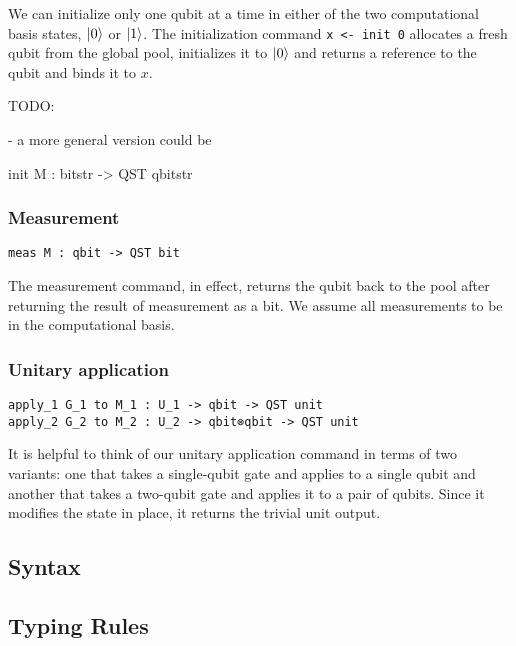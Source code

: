 \documentclass[adraft,creativecommons]{eptcs}
\theoremstyle{definition}
\theoremstyle{remark}
\begin{document}
We can initialize only one qubit at a time in either of the two computational basis states, $\ket{0}$ or $\ket{1}$. The initialization command \lstinline[language=QHaskell]{x <- init 0} allocates a fresh qubit from the global pool, initializes it to $\ket{0}$ and returns a reference to the qubit and binds it to $x$.

TODO:

- a more general version could be

init M : bitstr -> QST qbitstr

\subsubsection{Measurement}

\indent\indent\indent\lstinline[language=QHaskell]{meas M : qbit -> QST bit}\medskip

The measurement command, in effect, returns the qubit back to the pool after returning the result of measurement as a bit. We assume all measurements to be in the computational basis.

\subsubsection{Unitary application}

\indent\indent\indent\lstinline[language=QHaskell]{apply_1 G_1 to M_1 : U_1 -> qbit -> QST unit}\\

\indent\indent\lstinline[language=QHaskell]{apply_2 G_2 to M_2 : U_2 -> qbit⊗qbit -> QST unit}\medskip

It is helpful to think of our unitary application command in terms of two variants: one that takes a single-qubit gate and applies to a single qubit and another that takes a two-qubit gate and applies it to a pair of qubits. Since it modifies the state in place, it returns the trivial unit output.

\subsection{Syntax}





\subsection{Typing Rules}
\end{document}
